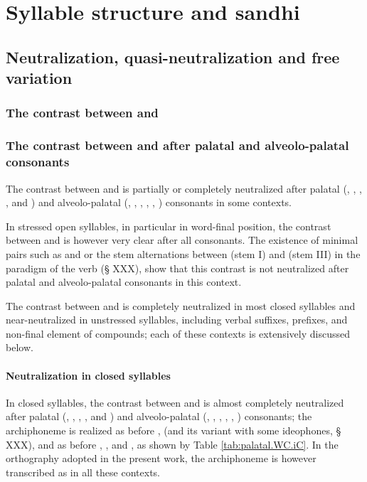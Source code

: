 \chapter{Syllable structure and sandhi} \label{sec:syllable}

\section{Neutralization, quasi-neutralization and free variation}

\subsection{The contrast between  and }

\subsection{The contrast between  and  after palatal and alveolo-palatal consonants}
The contrast between  and  is partially or completely neutralized after palatal (, , , ,  and ) and alveolo-palatal (, , , , , ) consonants in some contexts.

In stressed open syllables, in particular in word-final position, the contrast between  and  is however very clear after all consonants. The existence of minimal pairs such as  and  or the stem alternations between  (stem I) and  (stem III) in the paradigm of the verb  (§ XXX), show that this contrast is not neutralized after palatal and alveolo-palatal consonants in this context.

The contrast between  and  is completely neutralized in most closed syllables and near-neutralized in unstressed syllables, including verbal suffixes, prefixes, and non-final element of compounds; each of these contexts is extensively discussed below.

\subsubsection{Neutralization in closed syllables}
In closed syllables, the contrast between  and  is almost completely neutralized after palatal (, , , ,  and ) and alveolo-palatal (, , , , , ) consonants; the archiphoneme   is realized as  before ,  (and its variant  with some ideophones, § XXX), and as  before , ,  and , as shown by Table \ref{tab:palatal.WC.iC}. In the orthography adopted in the present work, the archiphoneme  is however transcribed as  in all these contexts.

